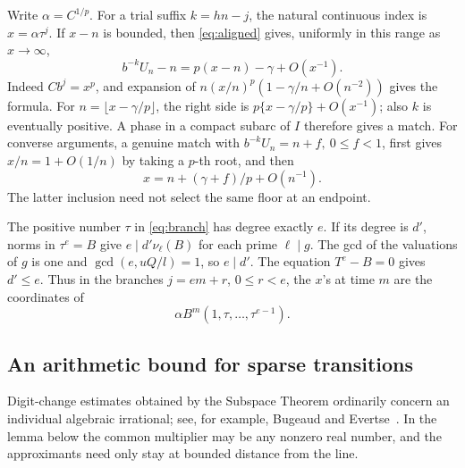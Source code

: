 \documentclass[11pt,reqno,a4paper]{amsart}
\theoremstyle{remark}
\begin{document}
Write \(\alpha=C^{1/p}\). For a trial suffix \(k=hn-j\), the natural
continuous index is \(x=\alpha\tau^j\). If \(x-n\) is bounded, then
\eqref{eq:aligned} gives, uniformly in this range as \(x\to\infty\),
\begin{equation}\label{eq:residual}
 b^{-k}U_n-n=p(x-n)-\gamma+O(x^{-1}).
\end{equation}
Indeed \(Cb^j=x^p\), and expansion of
\(n(x/n)^p(1-\gamma/n+O(n^{-2}))\) gives the formula.
For \(n=\lfloor x-\gamma/p\rfloor\), the right side is
\(p\{x-\gamma/p\}+O(x^{-1})\); also \(k\) is eventually positive.
A phase in a compact subarc of \(I\) therefore gives a match. For
converse arguments, a genuine match with \(b^{-k}U_n=n+f,\ 0\le f<1\),
first gives \(x/n=1+O(1/n)\) by taking a \(p\)-th root, and then
\begin{equation}\label{eq:inverse}
 x=n+(\gamma+f)/p+O(n^{-1}).
\end{equation}
The latter inclusion need not select the same floor at an endpoint.

The positive number \(\tau\) in \eqref{eq:branch} has degree exactly
\(e\). If its degree is \(d'\), norms in \(\tau^e=B\) give
\(e\mid d'\nu_\ell(B)\) for each prime \(\ell\mid g\).
The gcd of the valuations of \(g\) is one and
\(\gcd(e,uQ/l)=1\), so \(e\mid d'\). The equation \(T^e-B=0\)
gives \(d'\le e\). Thus in the branches \(j=em+r\), \(0\le r<e\),
the \(x\)'s at time \(m\) are the coordinates of
\begin{equation}\label{eq:line}
             \alpha B^m(1,\tau,\ldots,\tau^{e-1}).
\end{equation}

\subsection{An arithmetic bound for sparse transitions}
Digit-change estimates obtained by the Subspace Theorem ordinarily
concern an individual algebraic irrational; see, for example,
Bugeaud and Evertse~\cite{be-digits}. In the lemma below the common
multiplier may be any nonzero real number, and the approximants need
only stay at bounded distance from the line.
\end{document}
